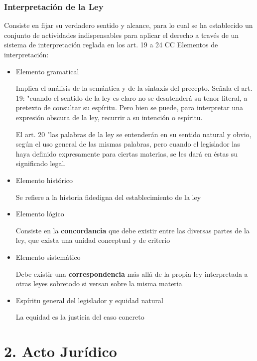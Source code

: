 \documentclass[]{article}
\begin{document}
\hypertarget{interpretaciuxf3n-de-la-ley}{%
\subsubsection{Interpretación de la
Ley}\label{interpretaciuxf3n-de-la-ley}}

Consiste en fijar su verdadero sentido y alcance, para lo cual se ha
establecido un conjunto de actividades indispensables para aplicar el
derecho a través de un sistema de interpretación reglada en los art. 19
a 24 CC Elementos de interpretación:

\begin{itemize}
\item
  Elemento gramatical

  Implica el análisis de la semántica y de la sintaxis del precepto.
  Señala el art. 19: "cuando el sentido de la ley es claro no se
  desatenderá su tenor literal, a pretexto de consultar su espíritu.
  Pero bien se puede, para interpretar una expresión obscura de la ley,
  recurrir a su intención o espíritu.

  El art. 20 "las palabras de la ley se entenderán en su sentido natural
  y obvio, según el uso general de las mismas palabras, pero cuando el
  legislador las haya definido expresamente para ciertas materias, se
  les dará en éstas su significado legal.
\item
  Elemento histórico

  Se refiere a la historia fidedigna del establecimiento de la ley
\item
  Elemento lógico

  Consiste en la \textbf{concordancia} que debe existir entre las
  diversas partes de la ley, que exista una unidad conceptual y de
  criterio
\item
  Elemento sistemático

  Debe existir una \textbf{correspondencia} más allá de la propia ley
  interpretada a otras leyes sobretodo si versan sobre la misma materia
\item
  Espíritu general del legislador y equidad natural

  La equidad es la justicia del caso concreto
\end{itemize}

\hypertarget{acto-juruxeddico}{%
\section{2. Acto Jurídico}\label{acto-juruxeddico}}
\end{document}
